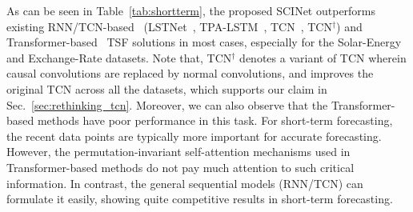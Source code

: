 \documentclass{article}
\begin{document}
As can be seen in Table~\ref{tab:shortterm}, the proposed SCINet outperforms existing RNN/TCN-based~ (LSTNet~\citep{Lai2018ModelingLA}, TPA-LSTM~\citep{Shih2019TemporalPA}, TCN~\citep{Bai2018AnEE}, TCN$^\dagger$) and Transformer-based~\citep{Wu2021AutoformerDT, Zhou2020InformerBE, vaswani2017attention} TSF solutions in most cases, especially for the Solar-Energy and Exchange-Rate datasets. 
Note that, TCN$^\dagger$ denotes a variant of TCN wherein causal convolutions are replaced by normal convolutions, and improves the original TCN across all the datasets, which supports our claim in Sec.~\ref{sec:rethinking_tcn}. 
Moreover, we can also observe that the Transformer-based methods have poor performance in this task. 
For short-term forecasting, the recent data points 
are typically more important for accurate forecasting. However, the permutation-invariant self-attention mechanisms used in Transformer-based methods do not pay much attention to such critical information. In contrast, the general sequential models (RNN/TCN) can formulate it easily, showing quite competitive results in short-term forecasting. 
\end{document}
